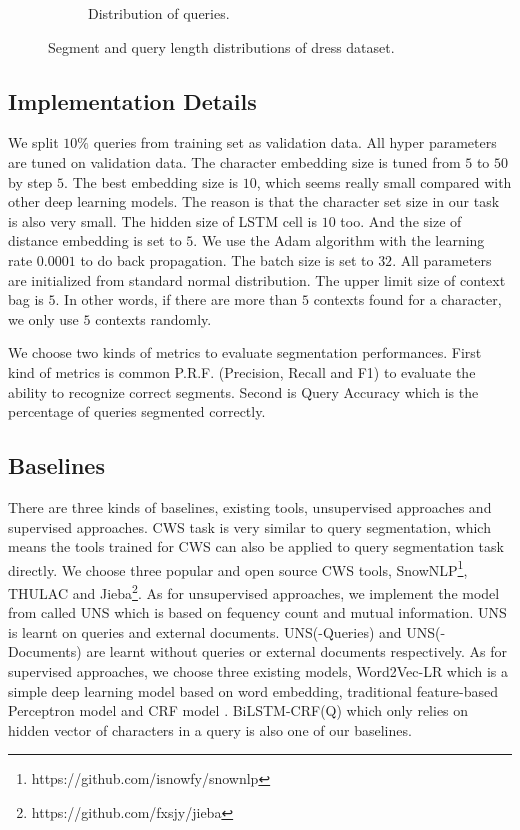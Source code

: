 \begin{figure}
\begin{subfigure}[b]{0.45\columnwidth}
		\caption[]%
		{{\small Distribution of queries.}}
		\label{fig:2}
	\end{subfigure}
	\caption[]
	{\small Segment and query length distributions of dress dataset.}
	\label{fig:12}
	\vspace{-10pt}
\end{figure}



\subsection{Implementation Details}

We split $10\%$ queries from training set as validation data. All hyper parameters are tuned on validation data. The character embedding size is tuned from $5$ to $50$ by step $5$. The best embedding size is $10$, which seems really small compared with other deep learning models. The reason is that the character set size in our task is also very small. The hidden size of LSTM cell is $10$ too. And the size of distance embedding is set to $5$. We use the Adam algorithm with the learning rate $0.0001$ to do back propagation. The batch size is set to $32$. All parameters are initialized from standard normal distribution. The upper limit size of context bag is $5$. In other words, if there are more than $5$ contexts found for a character, we only use $5$ contexts randomly.

We choose two kinds of metrics to evaluate segmentation performances. First kind of metrics is common P.R.F. (Precision, Recall and F1) to evaluate the ability to recognize correct segments. Second is Query Accuracy which is the percentage of queries segmented correctly.


\subsection{Baselines}

There are three kinds of baselines, existing tools, unsupervised approaches and supervised approaches. CWS task is very similar to query segmentation, which means the tools trained for CWS can also be applied to query segmentation task directly. We choose three popular and open source CWS tools, SnowNLP\footnote{https://github.com/isnowfy/snownlp}, THULAC \cite{sun2016thulac} and Jieba\footnote{https://github.com/fxsjy/jieba}. As for unsupervised approaches, we implement the model from \cite{risvik_query_2003} called UNS which is based on fequency count and mutual information. UNS is learnt on queries and external documents. UNS(-Queries) and UNS(-Documents) are learnt without queries or external documents respectively. As for supervised approaches, we choose three existing models, Word2Vec-LR \cite{kale_towards_2017} which is a simple deep learning model based on word embedding, traditional feature-based Perceptron model \cite{du_perceptron-based_2014} and CRF model \cite{yu_query_2009}. BiLSTM-CRF(Q) which only relies on hidden vector of characters in a query is also one of our baselines.

